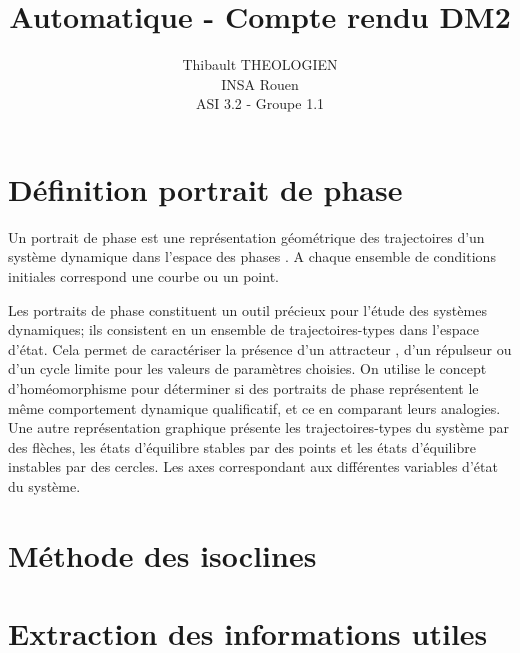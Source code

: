 \documentclass[a4paper,12pt]{article}
\title{Automatique - Compte rendu DM2}
\author{Thibault THEOLOGIEN\\
        INSA Rouen\\
        ASI 3.2 - Groupe 1.1}
\begin{document}
	\maketitle
	\tableofcontents
	\newpage

  \section{Définition portrait de phase}
    \label{sec:Définition portrait de phase}
    Un portrait de phase est une représentation géométrique des trajectoires d'un système dynamique dans l'espace des phases \footnotemark[1].
    A chaque ensemble de conditions initiales correspond une courbe ou un point.

    Les portraits de phase constituent un outil précieux pour l'étude des systèmes dynamiques; ils consistent en un ensemble de trajectoires-types dans l'espace d'état.
    Cela permet de caractériser la présence d'un attracteur \footnotemark[2], d'un répulseur ou d'un cycle limite \footnotemark[3] pour les valeurs de paramètres choisies.
    On utilise le concept d'homéomorphisme \footnotemark[4] pour déterminer si des portraits de phase représentent le même comportement dynamique qualificatif, et ce en comparant leurs analogies.
    Une autre représentation graphique présente les trajectoires-types du système par des flèches, les états d'équilibre stables par des points et les états d'équilibre instables par des cercles.
    Les axes correspondant aux différentes variables d'état du système.
    
    \newpage

  \section{Méthode des isoclines}
  \label{sec:Méthode des isoclines}
    \newpage

  \section{Extraction des informations utiles}
  \label{sec:Extraction des informations utiles}
    \newpage
\end{document}
